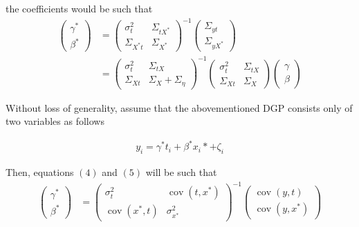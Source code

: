 \documentclass[12pt]{article}
\begin{document}
the coefficients would be such that
\begin{align}
    \left(\begin{array}{l}
{\gamma}^* \\
{\beta}^*
\end{array}\right)&=\left(\begin{array}{cc}
{\sigma}^2_{t} & \Sigma_{tX^*} \\
\Sigma_{X^*t} & {\Sigma}_{X^*}
\end{array}\right)^{-1}\left(\begin{array}{c}
\Sigma_{yt} \\
\Sigma_{yX^*}
\end{array}\right) \\
& =\left(\begin{array}{cc}
{\sigma}^2_{t} & \Sigma_{tX} \\
\Sigma_{Xt} & {\Sigma}_{X}+{\Sigma}_{\eta}
\end{array}\right)^{-1}\left(\begin{array}{cc}
{\sigma}^2_{t} & \Sigma_{tX} \\
\Sigma_{Xt} & {\Sigma}_{X}
\end{array}\right)\left(\begin{array}{l}
{\gamma} \\
{\beta}
\end{array}\right)
\end{align}

Without loss of generality, assume that the abovementioned DGP consists only of two variables as follows

	 \begin{align}
            y_i = \gamma^* t_i +  \beta^*x_i* + \zeta_i
        \end{align}

	Then, equations $(4)$ and $(5)$ will be such that
	\begin{align}
            \left(\begin{array}{l}
        {\gamma}^* \\
        {\beta}^*
        \end{array}\right)&=\left(\begin{array}{cc}
        {\sigma}^2_{t} & \operatorname{cov}({t,x^*}) \\
        \operatorname{cov}({x^*,t}) & {\sigma}_{x^*}^2
        \end{array}\right)^{-1}\left(\begin{array}{c}
        \operatorname{cov}{(y,t)} \\
        \operatorname{cov}{(y,x^*)}
        \end{array}\right) \\
        \end{align}
	
\end{document}
